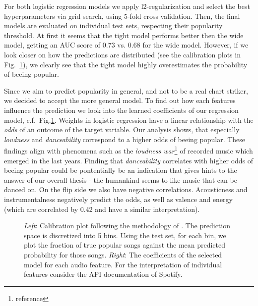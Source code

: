\documentclass{article}
\begin{document}
For both logistic regression models we apply l2-regularization and select the best hyperparameters via grid search, using 5-fold cross validation. Then, the final models are evaluated on individual test sets, respecting their popularity threshold.
At first it seems that the tight model performs better then the wide model, getting an AUC score of \num{0.73} vs. \num{0.68} for the wide model.
%
However, if we look closer on how the predictions are distributed (see the calibration plots in Fig.~\ref{fig:logis_eval}), we clearly see that the tight model highly overestimates the probability of beeing popular.

Since we aim to predict popularity in general, and not to be a real chart striker, we decided to accept the more general model.
To find out how each features influence the prediction we look into the learned coefficients of our regression model, c.f.~Fig.\ref{fig:logis_eval}.
Weights in logistic regression have a linear relationship with the \textit{odds} of an outcome of the target variable.
Our analysis shows, that especially \textit{loudness} and \textit{danceability} correspond to a higher odds of beeing popular.
These findings align with phenomena such as the \textit{loudness war}\footnote{reference} of recorded music which emerged in the last years.
Finding that \textit{danceability} correlates with higher odds of beeing popular could be pontentially be an indication that gives hints to the answer of our overall thesis - the humankind seems to like music that can be danced on.
On the flip side we also have negative correlations. 
Acousticness and instrumentalness negatively predict the odds, as well as valence and energy (which are correlated by 0.42 and have a similar interpretation).


\begin{figure}
  \caption{\textit{Left}: Calibration plot following the methodology of \cite{niculescu-mizilPredictingGoodProbabilities2005}. The prediction space is discretized into 5 bins. Using the test set, for each bin, we plot the fraction of true popular songs against the mean predicted probability for those songs. \textit{Right}: The coefficients of the selected model for each audio feature. For the interpretation of individual features consider the API documentation of Spotify.}
  \label{fig:logis_eval}
\end{figure}

  
\end{document}

